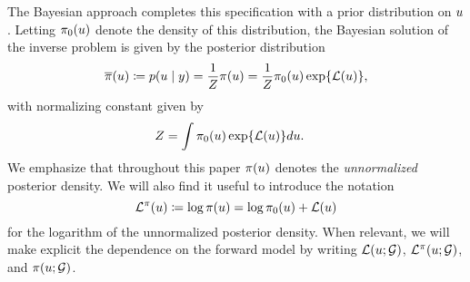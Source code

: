 \documentclass[12pt]{article}
\begin{document}
The Bayesian approach completes this specification with a prior distribution 
on $u$. Letting $\pi_0(u)$ denote the density of this distribution, the Bayesian solution of the inverse problem is given 
by the posterior distribution
\begin{align}
\overline{\pi}(u) \coloneqq p(u \mid y) = \frac{1}{Z}\pi(u) = \frac{1}{Z} \pi_0(u) \exp\mathopen{}\left\{\mathcal{L}(u)\right\}\mathclose{}, \label{post_dens}
\end{align}
with normalizing constant given by 
\begin{align}
Z &= \int \pi_0(u) \exp\mathopen{}\left\{\mathcal{L}(u)\right\}\mathclose{} du. \label{norm_cst}
\end{align}
We emphasize that throughout this paper $\pi(u)$ denotes the \textit{unnormalized} 
posterior density. We will also find it useful to introduce the notation
\begin{equation}
\mathcal{L}^{\pi}(u) \coloneqq \log \pi(u) = \log \pi_0(u) + \mathcal{L}(u) \label{eq:lpost}
\end{equation}
for the logarithm of the unnormalized posterior density.
When relevant, we will make explicit the dependence on the forward 
model by writing $\mathcal{L}(u; \mathcal{G})$, $\mathcal{L}^{\pi}(u; \mathcal{G})$, and $\pi(u; \mathcal{G})$. 
\end{document}
